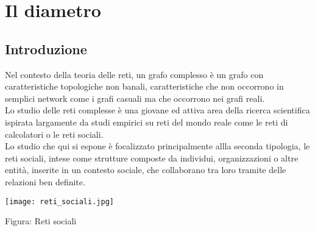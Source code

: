 \documentclass[twoside,openright,titlepage,fleqn,
	headinclude,11pt,a4paper,BCOR5mm,footinclude,pdftex
	]{scrbook}
\begin{document}
\frenchspacing
\raggedbottom
{}
\pagestyle{plain}

\pagestyle{scrheadings}
%
%
%
%



\chapter{Il diametro}
\section{Introduzione}
Nel contesto della teoria delle reti, un grafo complesso è un grafo con caratteristiche topologiche non banali, caratteristiche che non occorrono in semplici network come i grafi casuali ma che occorrono nei grafi reali.\\
Lo studio delle reti complesse è una giovane ed attiva area della ricerca scientifica ispirata largamente da studi empirici su reti del mondo reale come le reti di calcolatori o le reti sociali.\\Lo studio che qui si espone è focalizzato principalmente allla seconda tipologia, le reti sociali, intese come strutture composte da individui, organizzazioni o altre entità, inserite in un contesto sociale, che collaborano tra loro tramite delle relazioni ben definite.\\
\begin{center}
\texttt{[image: reti\_sociali.jpg]}
\caption{Figura: Reti sociali}
\end{center}
\end{document}
